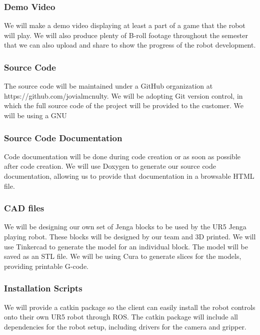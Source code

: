 \subsubsection{Demo Video}
We will make a demo video displaying at least a part of a game that the robot will play. We will also produce plenty of B-roll footage throughout the semester that we can also upload and share to show the progress of the robot development.

\subsubsection{Source Code}
The source code will be maintained under a GitHub organization at https://github.com/jovialmcnulty. We will be adopting Git version control, in which the full source code of the project will be provided to the customer. We will be using a GNU 

\subsubsection{Source Code Documentation}
Code documentation will be done during code creation or as soon as possible after code creation. We will use Doxygen to generate our source code documentation, allowing us to provide that documentation in a browsable HTML file. 


\subsubsection{CAD files}
We will be designing our own set of Jenga blocks to be used by the UR5 Jenga playing robot. These blocks will be designed by our team and 3D printed. We will use Tinkercad to generate the model for an individual block. The model will be saved as an STL file. We will be using Cura to generate slices for the models, providing printable G-code.

\subsubsection{Installation Scripts}
We will provide a catkin package so the client can easily install the robot controls onto their own UR5 robot through ROS. The catkin package will include all dependencies for the robot setup, including drivers for the camera and gripper.


